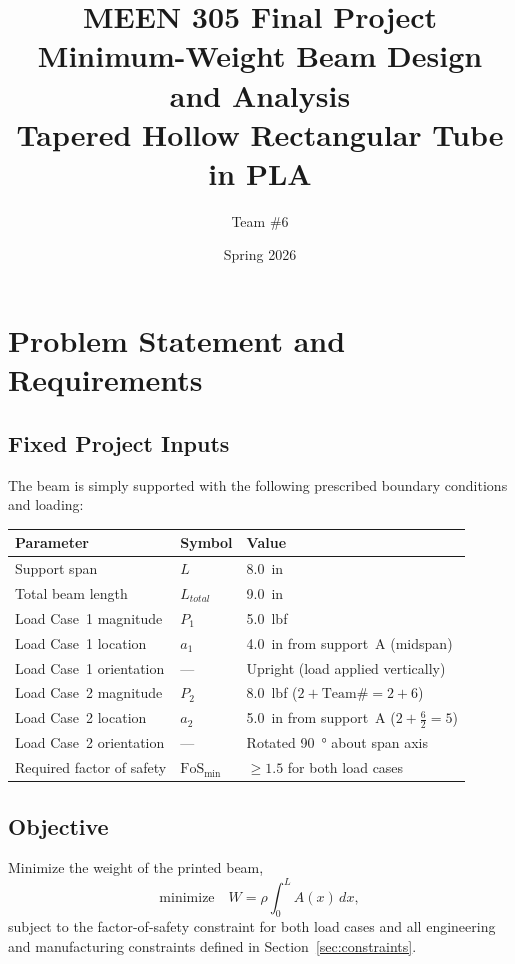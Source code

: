\documentclass[11pt,letterpaper]{article}
\title{\textbf{MEEN 305 Final Project}\\[0.5em]
       \large Minimum-Weight Beam Design and Analysis\\[0.3em]
       \large Tapered Hollow Rectangular Tube in PLA}
\author{Team \#6}
\date{Spring 2026}
\begin{document}
\maketitle
\tableofcontents
\newpage

\section{Problem Statement and Requirements}

\subsection{Fixed Project Inputs}

The beam is simply supported with the following prescribed boundary conditions
and loading:

\begin{center}
\begin{tabular}{lll}
\toprule
Parameter & Symbol & Value \\
\midrule
Support span & $L$ & \SI{8.0}{in} \\
Total beam length & $L_{total}$ & \SI{9.0}{in} \\
Load Case~1 magnitude & $P_1$ & \SI{5.0}{lbf} \\
Load Case~1 location & $a_1$ & \SI{4.0}{in} from support~A (midspan) \\
Load Case~1 orientation & --- & Upright (load applied vertically) \\
Load Case~2 magnitude & $P_2$ & \SI{8.0}{lbf} \quad ($2 + \text{Team\#} = 2 + 6$) \\
Load Case~2 location & $a_2$ & \SI{5.0}{in} from support~A \quad ($2 + \tfrac{6}{2} = 5$) \\
Load Case~2 orientation & --- & Rotated \SI{90}{\degree} about span axis \\
Required factor of safety & $\mathrm{FoS}_{\min}$ & $\ge 1.5$ for both load cases \\
\bottomrule
\end{tabular}
\end{center}

\subsection{Objective}

Minimize the weight of the printed beam,
\[
  \text{minimize}\quad W = \rho \int_0^{L} A(x)\,dx,
\]
subject to the factor-of-safety constraint for both load cases and all
engineering and manufacturing constraints defined in Section~\ref{sec:constraints}.
\end{document}
